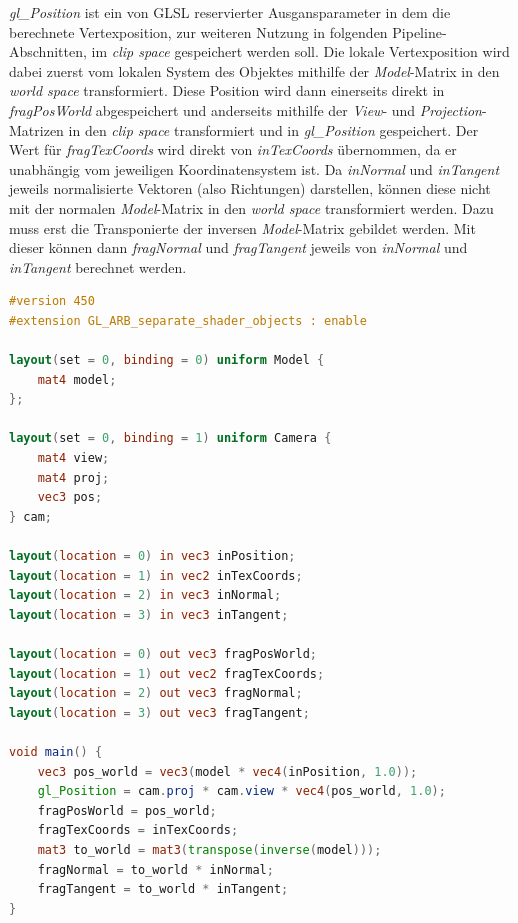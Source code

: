 \documentclass[oneside]{ausarbeitung}
\begin{document}
\textit{gl\_Position} ist ein von \ac{GLSL} reservierter Ausgansparameter in dem die berechnete Vertexposition, zur weiteren Nutzung in folgenden Pipeline-Abschnitten, im \textit{clip space} gespeichert werden soll. Die lokale Vertexposition wird dabei zuerst vom lokalen System des Objektes mithilfe der \textit{Model}-Matrix in den \textit{world space} transformiert.  Diese Position wird dann einerseits direkt in \textit{fragPosWorld} abgespeichert und anderseits mithilfe der \textit{View}- und \textit{Projection}-Matrizen in den \textit{clip space} transformiert und in \textit{gl\_Position} gespeichert. Der Wert für \textit{fragTexCoords} wird direkt von \textit{inTexCoords} übernommen, da er unabhängig vom jeweiligen Koordinatensystem ist. Da \textit{inNormal} und \textit{inTangent} jeweils normalisierte Vektoren (also Richtungen) darstellen, können diese nicht mit der normalen \textit{Model}-Matrix in den \textit{world space} transformiert werden. Dazu muss erst die Transponierte der inversen \textit{Model}-Matrix gebildet werden. Mit dieser können dann \textit{fragNormal} und \textit{fragTangent} jeweils von \textit{inNormal} und \textit{inTangent} berechnet werden.

\begin{minipage}{\textwidth}
\begin{lstlisting}[language=GLSL, label={lst:vertex_shader}, caption={Beispiel eines Vertex Shaders in \ac{GLSL}, welcher so in der \textbf{spider}-Engine verwendet wird}]
#version 450
#extension GL_ARB_separate_shader_objects : enable

layout(set = 0, binding = 0) uniform Model {
    mat4 model;
};

layout(set = 0, binding = 1) uniform Camera {
    mat4 view;
    mat4 proj;
    vec3 pos;
} cam;

layout(location = 0) in vec3 inPosition;
layout(location = 1) in vec2 inTexCoords;
layout(location = 2) in vec3 inNormal;
layout(location = 3) in vec3 inTangent;

layout(location = 0) out vec3 fragPosWorld;
layout(location = 1) out vec2 fragTexCoords;
layout(location = 2) out vec3 fragNormal;
layout(location = 3) out vec3 fragTangent;

void main() {
    vec3 pos_world = vec3(model * vec4(inPosition, 1.0));
    gl_Position = cam.proj * cam.view * vec4(pos_world, 1.0);
    fragPosWorld = pos_world;
    fragTexCoords = inTexCoords;
    mat3 to_world = mat3(transpose(inverse(model)));
    fragNormal = to_world * inNormal;
    fragTangent = to_world * inTangent;
}
\end{lstlisting}
\end{minipage}
\end{document}
